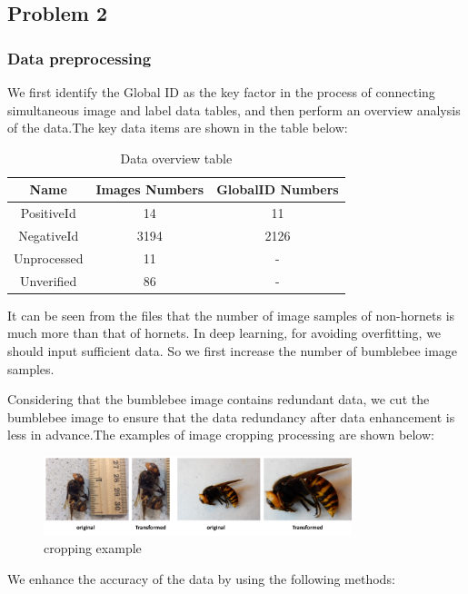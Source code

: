 \documentclass{mcmthesis}
\begin{document}
\hspace*{\fill}
\subsection{Problem 2}

\subsubsection{Data preprocessing}
We first identify the Global ID as the key factor in the process of connecting simultaneous image and label data tables, and then perform an overview analysis of the data.The key data items are shown in the table below:
\begin{table}[H]   %
	\centering	\caption{Data overview table}
	\begin{tabular}{ccc}
		\toprule[1.5pt]
Name &	Images Numbers	&GlobalID Numbers\\
		\midrule[1pt]
PositiveId&	14&	11\\
NegativeId&	3194&	2126\\
Unprocessed &11	&-\\
Unverified	&86&	-\\
		\bottomrule[1.5pt]
	\end{tabular}
\end{table}

It can be seen from the files that the number of image samples of non-hornets is much more than that of hornets. In deep learning, for  avoiding overfitting, we should input sufficient data. So we first increase the number of bumblebee image samples.

Considering that the bumblebee image contains  redundant data, we cut the bumblebee image to ensure that the data redundancy  after data enhancement is less in advance.The examples of image cropping processing are shown below:
\begin{figure}[H]
	\centering
	\includegraphics[width=0.8\textwidth]{screenshot014}
	\caption{cropping example}
	\label{fig:screenshot014}
\end{figure}

We enhance the accuracy of the data by using the following methods:
\end{document}

